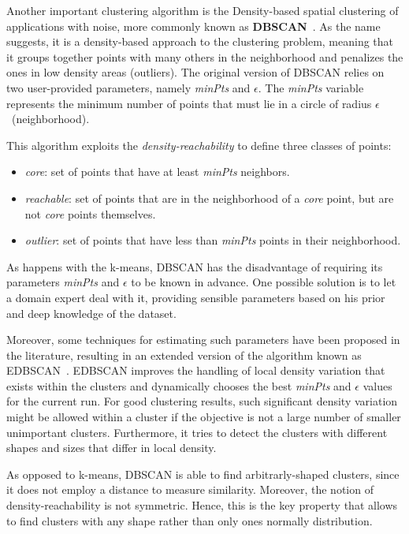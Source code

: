 Another important clustering algorithm is the Density-based spatial clustering of applications with noise, more commonly known as \textbf{DBSCAN}~\cite{ester1996density}.
As the name suggests, it is a density-based approach to the clustering problem,
meaning that it groups together points with many others in the neighborhood
and penalizes the ones in low density areas (outliers).
The original version of DBSCAN relies on two user-provided parameters, namely \emph{minPts} and $\epsilon$.
The \emph{minPts} variable represents the minimum number of points that must lie in a circle of radius $\epsilon$~(neighborhood).

This algorithm exploits the \emph{density-reachability} to define three classes of points:
\begin{itemize}
    \item \emph{core}: set of points that have at least \emph{minPts} neighbors.
    \item \emph{reachable}:
        set of points that are in the neighborhood of a \emph{core} point,
        but are not \emph{core} points themselves.
    \item \emph{outlier}:
        set of points that have less than \emph{minPts} points in their neighborhood.
\end{itemize}

As happens with the k-means, DBSCAN has the disadvantage of requiring its parameters \emph{minPts} and $\epsilon$ to be known in advance.
One possible solution is to let a domain expert deal with it, providing sensible parameters based on his prior and deep knowledge of the dataset.

Moreover, some techniques for estimating such parameters have been proposed in the literature, resulting in an extended version of the algorithm known as EDBSCAN~\cite{elbatta2013dynamic, ram2009enhanced}.
EDBSCAN improves the handling of local density variation that exists within the clusters and dynamically chooses the best \emph{minPts} and $\epsilon$ values for the current run.
For good clustering results, such significant density variation might be allowed within a cluster if the objective is not a large number of smaller unimportant clusters.
Furthermore, it tries to detect the clusters with different shapes and sizes that differ in local density.

As opposed to k-means, DBSCAN is able to find arbitrarly-shaped clusters, since it does not employ a distance to measure similarity.
Moreover, the notion of density-reachability is not symmetric.
Hence, this is the key property that allows to find clusters with any shape rather than only ones normally distribution.   